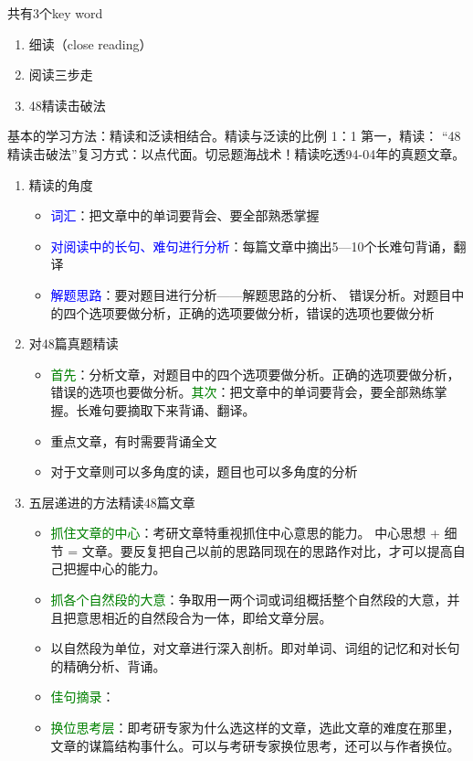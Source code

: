 \documentclass[11pt,twoside,openany,x11names,svgnames]{memoir}
\begin{document}
共有3个key word
\begin{enumerate}[(1)]
  \item 细读（close reading）
  \item 阅读三步走
  \item 48精读击破法
\end{enumerate}
基本的学习方法：精读和泛读相结合。精读与泛读的比例 1：1
第一，精读：
“48精读击破法”复习方式：以点代面。切忌题海战术！精读吃透94-04年的真题文章。
\begin{enumerate}
  \item 精读的角度
  \begin{itemize}
  \item \textcolor{blue}{词汇}：把文章中的单词要背会、要全部熟悉掌握
  \item \textcolor{blue}{对阅读中的长句、难句进行分析}：每篇文章中摘出5—10个长难句背诵，翻译
  \item \textcolor{blue}{解题思路}：要对题目进行分析——解题思路的分析、 错误分析。对题目中的四个选项要做分析，正确的选项要做分析，错误的选项也要做分析
\end{itemize}
  \item 对48篇真题精读
  \begin{itemize}
  \item \textcolor{green}{首先}：分析文章，对题目中的四个选项要做分析。正确的选项要做分析，错误的选项也要做分析。\textcolor{green}{其次}：把文章中的单词要背会，要全部熟练掌握。长难句要摘取下来背诵、翻译。
  \item 重点文章，有时需要背诵全文
  \item 对于文章则可以多角度的读，题目也可以多角度的分析
\end{itemize}
  \item 五层递进的方法精读48篇文章
  \begin{itemize}
  \item \textcolor{green}{抓住文章的中心}：考研文章特重视抓住中心意思的能力。 中心思想 + 细节 = 文章。要反复把自己以前的思路同现在的思路作对比，才可以提高自己把握中心的能力。
  \item \textcolor{green}{抓各个自然段的大意}：争取用一两个词或词组概括整个自然段的大意，并且把意思相近的自然段合为一体，即给文章分层。
  \item 以自然段为单位，对文章进行深入剖析。即对单词、词组的记忆和对长句的精确分析、背诵。
  \item \textcolor{green}{佳句摘录}：
  \item \textcolor{green}{换位思考层}：即考研专家为什么选这样的文章，选此文章的难度在那里，文章的谋篇结构事什么。可以与考研专家换位思考，还可以与作者换位。


\end{itemize}
\end{enumerate}
\end{document}
